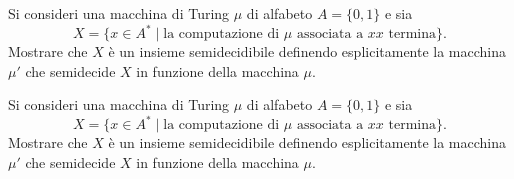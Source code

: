 \begin{ex}
Si consideri una macchina di Turing $\mu$ di alfabeto $A=\{0,1\}$ e sia
\[
X = \{x \in A^* \mid \text{la computazione di } \mu \text{ associata a } xx \text{ termina}\}.
\]
Mostrare che $X$ è un insieme semidecidibile definendo esplicitamente la macchina $\mu'$ che semidecide $X$ in funzione della macchina $\mu$.
\end{ex}

\begin{ex}
Si consideri una macchina di Turing $\mu$ di alfabeto $A=\{0,1\}$ e sia
\[
X=\{x\in A^*\mid \text{la computazione di }\mu\text{ associata a }xx\text{ termina}\}.
\]
Mostrare che $X$ è un insieme semidecidibile definendo esplicitamente la macchina $\mu'$ che semidecide $X$ in funzione della macchina $\mu$.
\end{ex}

